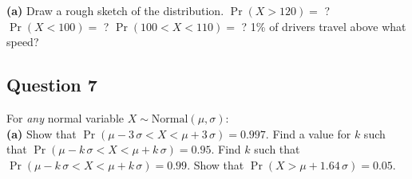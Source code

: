 \documentclass[12pt]{article}
\begin{document}
{\bf(a)} Draw a rough sketch of the distribution.  $\Pr(X>120)=$ ?  $\Pr(X<100)=$ ?  $\Pr(100<X<110)=$ ?  1\% of drivers travel above what speed?


\subsection*{Question 7}
For \emph{any} normal variable $X \sim \text{Normal}(\mu,\sigma)$:\\[-0.2cm]

{\bf(a)} Show that $\Pr(\mu-3\,\sigma<X<\mu+3\,\sigma) = 0.997$.  Find a value for $k$ such that $\Pr(\mu-k\,\sigma<X<\mu+k\,\sigma) = 0.95$.  Find $k$ such that $\Pr(\mu-k\,\sigma<X<\mu+k\,\sigma) = 0.99$.  Show that $\Pr(X>\mu+1.64\,\sigma) = 0.05.$
\end{document}
